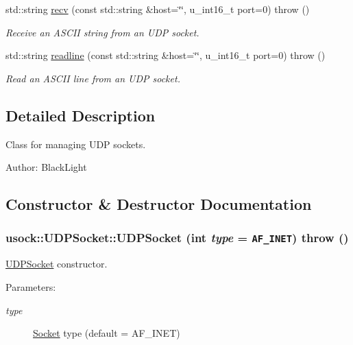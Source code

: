 \begin{CompactItemize}
std::string \hyperlink{classusock_1_1UDPSocket_d6dec5293e2768a42b833fb42a720d22}{recv} (const std::string \&host=\char`\"{}\char`\"{}, u\_\-int16\_\-t port=0)  throw ()
\begin{CompactList}\small\item\em Receive an ASCII string from an UDP socket. \item\end{CompactList}\item 
std::string \hyperlink{classusock_1_1UDPSocket_aead0f8a12cc8e98a98473bea4d15a0e}{readline} (const std::string \&host=\char`\"{}\char`\"{}, u\_\-int16\_\-t port=0)  throw ()
\begin{CompactList}\small\item\em Read an ASCII line from an UDP socket. \item\end{CompactList}\end{CompactItemize}


\subsection{Detailed Description}
Class for managing UDP sockets. 

\begin{Desc}
\item[Author:]BlackLight \end{Desc}


\subsection{Constructor \& Destructor Documentation}
\hypertarget{classusock_1_1UDPSocket_f1db79ca3083ee144302c2ad9fc1b017}{
\subsubsection[{UDPSocket}]{\setlength{\rightskip}{0pt plus 5cm}usock::UDPSocket::UDPSocket (int {\em type} = {\tt AF\_\-INET})  throw ()}}
\label{classusock_1_1UDPSocket_f1db79ca3083ee144302c2ad9fc1b017}


\hyperlink{classusock_1_1UDPSocket}{UDPSocket} constructor. 

\begin{Desc}
\item[Parameters:]
\begin{description}
\item[{\em type}]\hyperlink{classusock_1_1Socket}{Socket} type (default = AF\_\-INET) \end{description}
\end{Desc}


